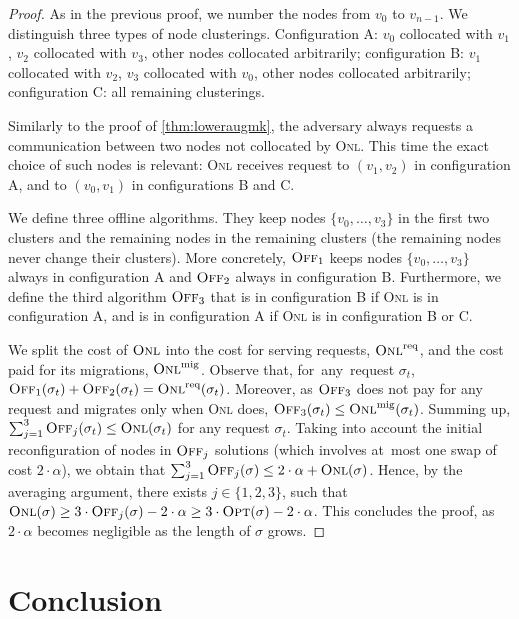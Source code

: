 \documentclass{siamart190516}
\newcommand{\ONL}{\textsc{Onl}\xspace}
\newcommand{\ONLreq}{\textsc{Onl}^\textnormal{req}\xspace}
\newcommand{\ONLmig}{\textsc{Onl}^\textnormal{mig}\xspace}
\newcommand{\OFF}{\textsc{Off}\xspace}
\newcommand{\OPT}{\textsc{Opt}\xspace}
\begin{document}
\begin{proof} As in the previous proof, we number the nodes from $v_0$ to
$v_{n-1}$. We distinguish three types of node clusterings. Configuration A:
$v_0$ collocated with $v_1$, $v_2$ collocated with $v_3$, other nodes
collocated arbitrarily; configuration B: $v_1$ collocated with $v_2$, $v_3$
collocated with $v_0$, other nodes collocated arbitrarily; configuration C:
all remaining clusterings.

Similarly to the proof of \cref{thm:loweraugmk}, the adversary always
requests a communication between two nodes not collocated by \ONL.
This time the exact choice of such nodes is relevant: \ONL receives request to
$(v_1,v_2)$ in configuration A, and to $(v_0,v_1)$ in configurations B and C.

We define three offline algorithms. They keep nodes
$\{v_0,\ldots,v_3\}$ in the first two clusters and the remaining nodes in the
remaining clusters (the remaining nodes never change their clusters). 
More concretely, $\OFF_1$ keeps nodes $\{v_0,\ldots,v_3\}$ always in
configuration A and $\OFF_2$ always in configuration B. Furthermore, we define
the third algorithm $\OFF_3$ that is in configuration B if \ONL is in
configuration A, and is in configuration A if \ONL is in configuration B or C.

We split the cost of $\ONL$ into the cost for serving requests, $\ONLreq$, and
the cost paid for its migrations, $\ONLmig$. Observe that, for~any~request
$\sigma_t$, $\OFF_1(\sigma_t) + \OFF_2(\sigma_t) = \ONLreq(\sigma_t)$.
Moreover, as $\OFF_3$ does not pay for any request and migrates only when 
\ONL does, $\OFF_3(\sigma_t) \leq \ONLmig(\sigma_t)$. Summing up,
$\sum_{j=1}^3 \OFF_j(\sigma_t) \leq \ONL(\sigma_t)$ for any request $\sigma_t$.
Taking into account the initial reconfiguration of nodes in $\OFF_j$ solutions
(which involves at~most one swap of cost $2 \cdot \alpha$), we obtain that
$\sum_{j=1}^3 \OFF_j(\sigma) \leq 2 \cdot \alpha + \ONL(\sigma)$. Hence, by the
averaging argument, there exists $j \in \{1,2,3\}$, such that $\ONL(\sigma)
\geq 3 \cdot \OFF_j(\sigma) - 2 \cdot \alpha \geq 3 \cdot \OPT(\sigma) - 
2 \cdot \alpha$. This concludes the proof, as $2 \cdot \alpha$ becomes
negligible as the length of $\sigma$ grows.
\end{proof}

\section{Conclusion}
\label{sec:conclusion}
\end{document}
